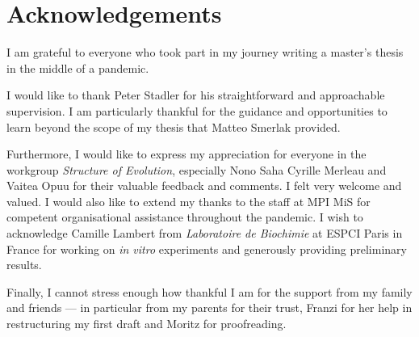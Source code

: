 \documentclass[../master.tex]{subfiles}
\begin{document}
\setcounter{page}{3}
\section*{Acknowledgements}
\label{sec:acknowledgements}

I am grateful to everyone who took part in my journey writing a master's thesis in the middle of a pandemic.

I would like to thank Peter Stadler for his straightforward and approachable supervision.
I am particularly thankful for the guidance and opportunities to learn beyond the scope of my thesis that Matteo Smerlak provided.

Furthermore, I would like to express my appreciation for everyone in the workgroup \emph{Structure of Evolution}, especially Nono Saha Cyrille Merleau and Vaitea Opuu for their valuable feedback and comments.
I felt very welcome and valued.
I would also like to extend my thanks to the staff at MPI MiS for competent organisational assistance throughout the pandemic.
I wish to acknowledge Camille Lambert from \emph{Laboratoire de Biochimie} at ESPCI Paris in France for working on \textit{in vitro} experiments and generously providing preliminary results.

Finally, I cannot stress enough how thankful I am for the support from my family and friends --- in particular from my parents for their trust, Franzi for her help in restructuring my first draft and Moritz for proofreading.
\end{document}
